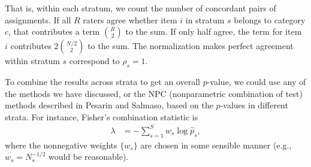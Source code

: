 \documentclass[]{article}
\begin{document}
That is, within each stratum, we count the number of concordant pairs of
assignments.
If all $R$ raters agree whether item $i$ in stratum $s$ belongs to category
$c$, that contributes a term ${R \choose 2}$ to the sum.
If only half agree, the term for item $i$ contributes $2 {N/2 \choose 2}$ to
the sum.
The normalization makes perfect agreement within stratum $s$ correspond to
$\rho_s = 1$.

To combine the results across strata to get an overall $p$-value, we could
use any of the methods we have discussed, or the NPC (nonparametric
combination of test) methods described in Pesarin and Salmaso, based on
the $p$-values in different strata.
For instance, Fisher's combination statistic is
\begin{align*}
    \lambda &= - \sum_{s=1}^S w_s \log \hat{p}_s,
\end{align*}
where the nonnegative weights $\{w_s\}$ are chosen in some sensible manner
(e.g., $w_s = N_s^{-1/2}$ would be reasonable).
\end{document}
